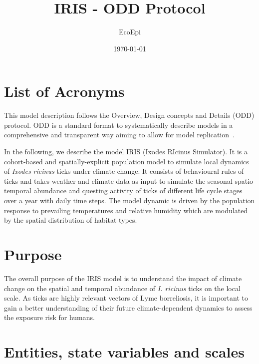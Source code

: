 \documentclass[a4paper, 11pt]{scrartcl}
\title{IRIS - ODD Protocol}
\author{EcoEpi}
\date{\today}
\begin{document}
\maketitle
\tableofcontents

\newpage
\listoffigures
\listoftables

\section*{List of Acronyms}
\begin{acronym}
\end{acronym}


\newpage
This model description follows the Overview, Design concepts and Details (ODD) protocol. ODD is a standard format to systematically describe models in a comprehensive and transparent way aiming to allow for model replication~\parencite{Grimm.2010, Grimm.2020}.

In the following, we describe the model IRIS (Ixodes RIcinus Simulator). It is a cohort-based and spatially-explicit population model to simulate local dynamics of \textit{Ixodes ricinus} ticks under climate change. It consists of behavioural rules of ticks and takes weather and climate data as input to simulate the seasonal spatio-temporal abundance and questing activity of ticks of different life cycle stages over a year with daily time steps. The model dynamic is driven by the population response to prevailing temperatures and relative humidity which are modulated by the spatial distribution of habitat types.


\section{Purpose}
The overall purpose of the IRIS model is to understand the impact of climate change on the spatial and temporal abundance of \textit{I. ricinus} ticks on the local scale. As ticks are highly relevant vectors of Lyme borreliosis, it is important to gain a better understanding of their future climate-dependent dynamics to assess the exposure risk for humans.


\section{Entities, state variables and scales}
\end{document}
